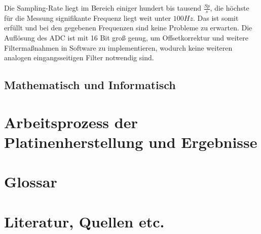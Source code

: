 \documentclass[12pt,a4paper,notitlepage]{article}
\begin{document}
Die \gls{Sampling}-Rate liegt im Bereich einiger hundert bis tausend $\frac{Sp}{s}$, die höchste für die Messung signifikante Frequenz liegt weit unter $100Hz$. Das  ist somit erfüllt und bei den gegebenen Frequenzen sind keine Probleme zu erwarten.
Die Auflösung des \gls{ADC} ist mit 16 Bit groß genug, um \gls{Offsetkorrektur} und weitere Filtermaßnahmen in Software zu implementieren, wodurch keine weiteren analogen eingangsseitigen Filter notwendig sind.

\subsection{Mathematisch und Informatisch}
\section{Arbeitsprozess der Platinenherstellung und Ergebnisse}
\appendix
\section{Glossar}
\glsaddall
\printglossaries
\section{Literatur, Quellen etc.}
\nocite{*}

\renewcommand{\refname}{}

\end{document}

